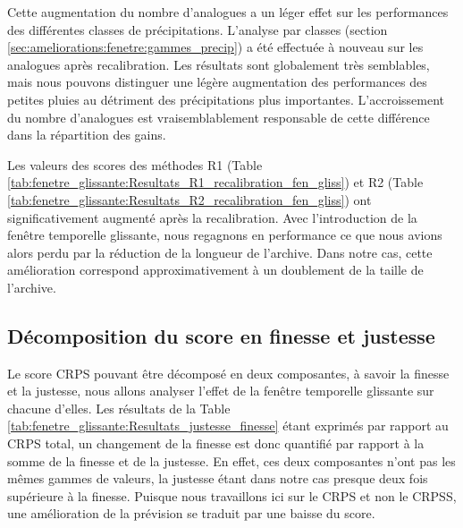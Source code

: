 \documentclass[hess]{copernicus}
\begin{document}
Cette augmentation du nombre d'analogues a un léger effet sur les performances des différentes classes de précipitations. L'analyse par classes (section \ref{sec:ameliorations:fenetre:gammes_precip}) a été effectuée à nouveau sur les analogues après recalibration. Les résultats sont globalement très semblables, mais nous pouvons distinguer une légère augmentation des performances des petites pluies au détriment des précipitations plus importantes. L'accroissement du nombre d'analogues est vraisemblablement responsable de cette différence dans la répartition des gains.

Les valeurs des scores des méthodes R1 (Table \ref{tab:fenetre_glissante:Resultats_R1_recalibration_fen_gliss}) et R2 (Table \ref{tab:fenetre_glissante:Resultats_R2_recalibration_fen_gliss}) ont significativement augmenté après la recalibration. Avec l'introduction de la fenêtre temporelle glissante, nous regagnons en performance ce que nous avions alors perdu par la réduction de la longueur de l'archive. Dans notre cas, cette amélioration correspond approximativement à un doublement de la taille de l'archive.


\subsection{Décomposition du score en finesse et justesse}

Le score CRPS pouvant être décomposé en deux composantes, à savoir la finesse et la justesse, nous allons analyser l'effet de la fenêtre temporelle glissante sur chacune d'elles. Les résultats de la Table \ref{tab:fenetre_glissante:Resultats_justesse_finesse} étant exprimés par rapport au CRPS total, un changement de la finesse est donc quantifié par rapport à la somme de la finesse et de la justesse. En effet, ces deux composantes n'ont pas les mêmes gammes de valeurs, la justesse étant dans notre cas presque deux fois supérieure à la finesse. Puisque nous travaillons ici sur le CRPS et non le CRPSS, une amélioration de la prévision se traduit par une baisse du score.
\end{document}
